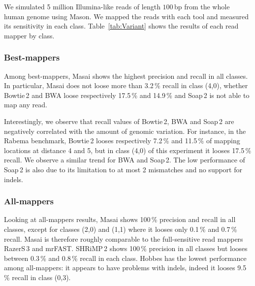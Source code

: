We simulated 5 million Illumina-like reads of length $100$\,bp from the whole human genome using Mason.
We mapped the reads with each tool and measured its sensitivity in each class.
Table~\ref{tab:Variant} shows the results of each read mapper by class.

\subsubsection{Best-mappers}

Among best-mappers, Masai shows the highest precision and recall in all classes.
In particular, Masai does not loose more than 3.2\,\% recall in class (4,0), whether Bowtie\,2 and BWA loose respectively 17.5\,\% and 14.9\,\% and Soap\,2 is not able to map any read.

Interestingly, we observe that recall values of Bowtie\,2, BWA and Soap\,2 are negatively correlated with the amount of genomic variation.
For instance, in the Rabema benchmark, Bowtie\,2 looses respectively 7.2\,\% and 11.5\,\% of mapping locations at distance 4 and 5, but in class (4,0) of this experiment it looses 17.5\,\% recall.
We observe a similar trend for BWA and Soap\,2.
The low performance of Soap\,2 is also due to its limitation to at most 2 mismatches and no support for indels.

\subsubsection{All-mappers}

Looking at all-mappers results, Masai shows 100\,\% precision and recall in all classes, except for classes (2,0) and (1,1) where it looses only 0.1\,\% and 0.7\,\% recall.
Masai is therefore roughly comparable to the full-sensitive read mappers RazerS\,3 and mrFAST.
SHRiMP\,2 shows 100\,\% precision in all classes but looses between 0.3\,\% and 0.8\,\% recall in each class.
Hobbes has the lowest performance among all-mappers: it appears to have problems with indels, indeed it looses 9.5\,\% recall in class (0,3).

\begin{table*}[tH!]
  \caption[Variant detection results]
  {
  \label{tab:Variant}
    {\bfseries Variant detection results.} We show the percentages of found origins (recall) and fraction of unique reads mapped to their origin (precision) classed by reads with $s$ SNPs and $i$ indels $(s,i)$.
  }
  \vspace{-3mm}
  \center
  \sffamily
  \resizebox{0.8\textwidth}{!}
  {
	\renewcommand{\tabcolsep}{0.8ex}
	
  }
\end{table*}

